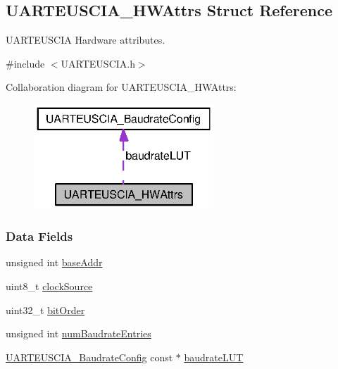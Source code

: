 \subsection{U\-A\-R\-T\-E\-U\-S\-C\-I\-A\-\_\-\-H\-W\-Attrs Struct Reference}
\label{struct_u_a_r_t_e_u_s_c_i_a___h_w_attrs}


U\-A\-R\-T\-E\-U\-S\-C\-I\-A Hardware attributes.  




{\ttfamily \#include $<$U\-A\-R\-T\-E\-U\-S\-C\-I\-A.\-h$>$}



Collaboration diagram for U\-A\-R\-T\-E\-U\-S\-C\-I\-A\-\_\-\-H\-W\-Attrs\-:
\nopagebreak
\begin{figure}[H]
\begin{center}
\leavevmode
\includegraphics[width=191pt]{struct_u_a_r_t_e_u_s_c_i_a___h_w_attrs__coll__graph}
\end{center}
\end{figure}
\subsubsection*{Data Fields}
\begin{DoxyCompactItemize}
\item 
unsigned int \hyperlink{struct_u_a_r_t_e_u_s_c_i_a___h_w_attrs_afa40bb7e1a85f9e20565a690ed9b86cc}{base\-Addr}
\item 
uint8\-\_\-t \hyperlink{struct_u_a_r_t_e_u_s_c_i_a___h_w_attrs_a159323cc716d9d4fc0f5ece693f3d528}{clock\-Source}
\item 
uint32\-\_\-t \hyperlink{struct_u_a_r_t_e_u_s_c_i_a___h_w_attrs_a48aec31e8f3fb52f3474a00ba00b485b}{bit\-Order}
\item 
unsigned int \hyperlink{struct_u_a_r_t_e_u_s_c_i_a___h_w_attrs_aba3f3da62966d8a0ea9956dafa74aea5}{num\-Baudrate\-Entries}
\item 
\hyperlink{struct_u_a_r_t_e_u_s_c_i_a___baudrate_config}{U\-A\-R\-T\-E\-U\-S\-C\-I\-A\-\_\-\-Baudrate\-Config} const $\ast$ \hyperlink{struct_u_a_r_t_e_u_s_c_i_a___h_w_attrs_a38c226d296905607c444d1d7ec2e04fe}{baudrate\-L\-U\-T}
\end{DoxyCompactItemize}


